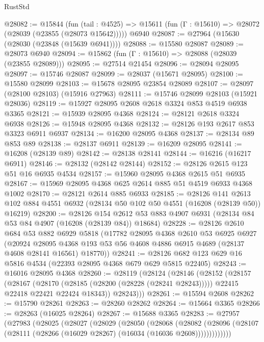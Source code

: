 \begin{lexlean}{RustStd}
\begin{coremodule}
@28082 := @15844
    (fun (tail : @4525) => @15611 (fun (Γ : @15610) => @28072 (@28039 (@23855 (@28073 @15642)))))
    @6940
@28087 := @27964 (@15630 (@28030 (@23848 (@15639 @6941))))
@28088 := @15580 @28087
@28089 := @28073 @6940
@28094 := @15862 (fun (Γ : @15610) => @28088 (@28039 (@23855 @28089)))
@28095 := @27514 @21454
@28096 := @28094 @28095
@28097 := @15746 @28087
@28099 := @28037 (@15671 @28095)
@28100 := @15580 @28099
@28103 := @15678 @28095 @23854 @28089
@28107 := @28097 (@28100 @28103) (@15916 @27963)
@28111 := @15746 @28099 @28103 (@15921 @28036)
@28119 := @15927 @28095 @2608 @2618 @3324 @853 @4519 @6938 @3365
@28121 := @15939 @28095 @4368
@28124 := @28121 @2618 @3324 @6938
@28126 := @15948 @28095 @4368
@28132 := @28126 @193 @2617 @853 @3323 @6911 @6937
@28134 := @16200 @28095 @4368
@28137 := @28134 @89 @853 @89
@28138 := @28137 @6911
@28139 := @16209 @28095
@28141 := @16208 (@28139 @89)
@28142 := @28138 @28141
@28144 := @16216 (@16217 @6911)
@28146 := @28132 (@28142 @28144)
@28152 := @28126 @2615 @123 @51 @16 @6935 @4534
@28157 := @15960 @28095 @4368 @2615 @51 @6935
@28167 := @15969 @28095 @4368 @625 @2614 @885 @51 @4519 @6933 @4368 @1002
@28170 := @28121 @2614 @885 @6933
@28185 := @28126
    @141
    @2613
    @102
    @884
    @4551
    @6932
    (@28134 @50 @102 @50 @4551 (@16208 (@28139 @50)) @16219)
@28200 := @28126
    @154
    @2612
    @53
    @883
    @4907
    @6931
    (@28134 @84 @53 @84 @4907 (@16208 (@28139 @84)) @18684)
@28228 := @28126
    @2610
    @684
    @53
    @882
    @6929
    @5818
    (@17782
      @28095
      @4368
      @2610
      @53
      @6925
      @6927
      (@20924
        @28095
        @4368
        @193
        @53
        @56
        @4608
        @4886
        @6915
        @4689
        (@28137 @4608 @28141 @16561)
        @18770))
@28241 := @28126 @682 @123 @629 @16 @5816 @4534 (@22393 @28095 @4368 @679 @629 @5815 @22405)
@28243 := @16016 @28095 @4368
@28260 := @28119
    (@28124
      (@28146
        (@28152
          (@28157
            (@28167
              (@28170 (@28185 (@28200 (@28228 (@28241 @28243)))))
              @22415
              @22418
              @22421
              @22424
              @18343))
          @28243)))
@28261 := @15594 @2608
@28262 := @15790 @28261
@28263 := @28260 @28262
@28264 := @15664 @3365
@28266 := @28263 (@16025 @28264)
@28267 := @15688 @3365
@28283 := @27957
    (@27983
      (@28025
        (@28027
          (@28029
            (@28050
              (@28068
                (@28082
                  (@28096 (@28107 (@28111 (@28266 (@16029 @28267) (@16034 (@16036 @2608)))))))))))))

\end{coremodule}
\end{lexlean}
